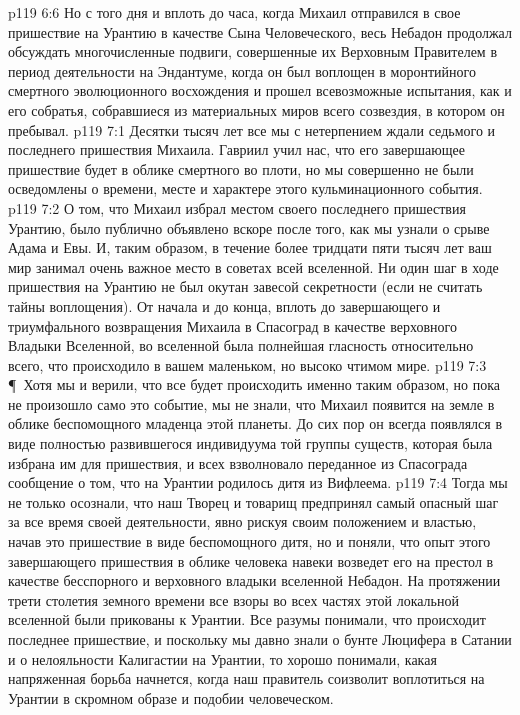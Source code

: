 \vs p119 6:6 Но с того дня и вплоть до часа, когда Михаил отправился в свое пришествие на Урантию в качестве Сына Человеческого, весь Небадон продолжал обсуждать многочисленные подвиги, совершенные их Верховным Правителем в период деятельности на Эндантуме, когда он был воплощен в моронтийного смертного эволюционного восхождения и прошел всевозможные испытания, как и его собратья, собравшиеся из материальных миров всего созвездия, в котором он пребывал.
\vs p119 7:1 Десятки тысяч лет все мы с нетерпением ждали седьмого и последнего пришествия Михаила. Гавриил учил нас, что его завершающее пришествие будет в облике смертного во плоти, но мы совершенно не были осведомлены о времени, месте и характере этого кульминационного события.
\vs p119 7:2 О том, что Михаил избрал местом своего последнего пришествия Урантию, было публично объявлено вскоре после того, как мы узнали о срыве Адама и Евы. И, таким образом, в течение более тридцати пяти тысяч лет ваш мир занимал очень важное место в советах всей вселенной. Ни один шаг в ходе пришествия на Урантию не был окутан завесой секретности (если не считать тайны воплощения). От начала и до конца, вплоть до завершающего и триумфального возвращения Михаила в Спасоград в качестве верховного Владыки Вселенной, во вселенной была полнейшая гласность относительно всего, что происходило в вашем маленьком, но высоко чтимом мире.
\vs p119 7:3 \P\ Хотя мы и верили, что все будет происходить именно таким образом, но пока не произошло само это событие, мы не знали, что Михаил появится на земле в облике беспомощного младенца этой планеты. До сих пор он всегда появлялся в виде полностью развившегося индивидуума той группы существ, которая была избрана им для пришествия, и всех взволновало переданное из Спасограда сообщение о том, что на Урантии родилось дитя из Вифлеема.
\vs p119 7:4 Тогда мы не только осознали, что наш Творец и товарищ предпринял самый опасный шаг за все время своей деятельности, явно рискуя своим положением и властью, начав это пришествие в виде беспомощного дитя, но и поняли, что опыт этого завершающего пришествия в облике человека навеки возведет его на престол в качестве бесспорного и верховного владыки вселенной Небадон. На протяжении трети столетия земного времени все взоры во всех частях этой локальной вселенной были прикованы к Урантии. Все разумы понимали, что происходит последнее пришествие, и поскольку мы давно знали о бунте Люцифера в Сатании и о нелояльности Калигастии на Урантии, то хорошо понимали, какая напряженная борьба начнется, когда наш правитель соизволит воплотиться на Урантии в скромном образе и подобии человеческом.
